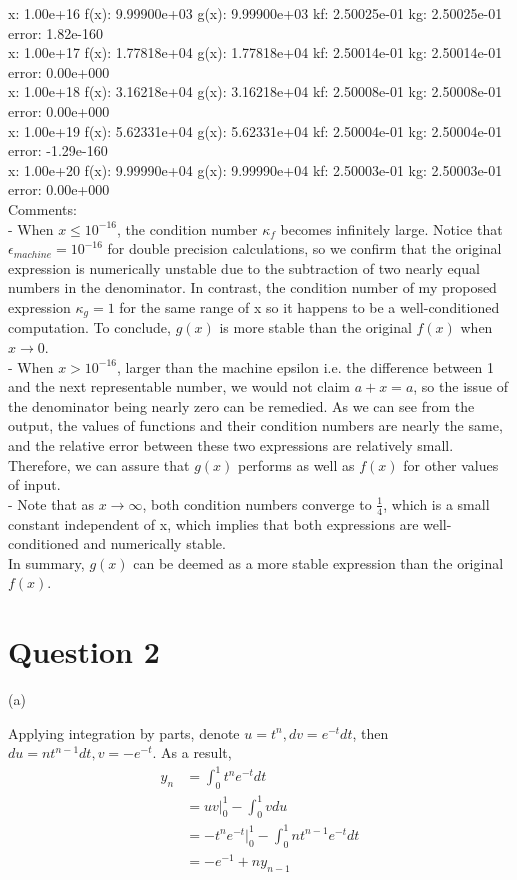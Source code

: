 \documentclass[12pt]{article}
\begin{document}
x: 1.00e+16 f(x): 9.99900e+03 g(x): 9.99900e+03 kf: 2.50025e-01 kg:  2.50025e-01 error:  1.82e-160 \\
x: 1.00e+17 f(x): 1.77818e+04 g(x): 1.77818e+04 kf: 2.50014e-01 kg:  2.50014e-01 error:  0.00e+000 \\
x: 1.00e+18 f(x): 3.16218e+04 g(x): 3.16218e+04 kf: 2.50008e-01 kg:  2.50008e-01 error:  0.00e+000 \\
x: 1.00e+19 f(x): 5.62331e+04 g(x): 5.62331e+04 kf: 2.50004e-01 kg:  2.50004e-01 error: -1.29e-160 \\
x: 1.00e+20 f(x): 9.99990e+04 g(x): 9.99990e+04 kf: 2.50003e-01 kg:  2.50003e-01 error:  0.00e+000 \\

Comments:\\
-  When $x \leq 10^{-16}$, the condition number $\kappa_f$ becomes infinitely large. Notice that $\epsilon_{machine} = 10^{-16}$ for double precision calculations, so we confirm that the original expression is numerically unstable due to the subtraction of two nearly equal numbers in the denominator. In contrast, the condition number of my proposed expression $\kappa_g = 1$ for the same range of x so it happens to be a well-conditioned computation. To conclude, $g(x)$ is more stable than the original $f(x)$ when $x \to 0$.\\
- When $x >10^{-16}$, larger than the machine epsilon i.e. the difference between 1 and the next representable number, we would not claim $a+x = a$, so the issue of the denominator being nearly zero can be remedied. As we can see from the output, the values of functions and their condition numbers are nearly the same, and the relative error between these two expressions are relatively small. Therefore, we can assure that $g(x)$ performs as well as $f(x)$ for other values of input.\\
- Note that as $x \to \infty$, both condition numbers converge to $\frac{1}{4}$, which is a small constant independent of x, which implies that both expressions are well-conditioned and numerically stable.\\
In summary, $g(x)$ can be deemed as a more stable expression than the original $f(x)$.


\section{Question 2}

(a)

Applying integration by parts, denote $u=t^n, dv=e^{-t}dt$, then $du=nt^{n-1}dt, v=-e^{-t}$. As a result,
\begin{equation*}
\begin{split}
y_n &= \int_{0}^1 t^n e^{-t}dt  \\
&= uv\Big|_0^1 - \int_{0}^1 v du \\
&= -t^n e^{-t}\Big|_0^1- \int_{0}^1 n t^{n-1}e^{-t}dt \\ 
&= -e^{-1}+ny_{n-1}
\end{split}
\end{equation*}
\end{document}
